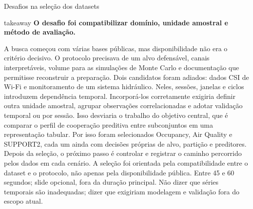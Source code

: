 \begin{frame}{Desafios na seleção dos datasets}
  \vspace{.12cm}
  \begin{beamercolorbox}[wd=\linewidth,sep=.12cm,rounded=true]{takeaway}
    \centering\sffamily\bfseries\fontsize{10.1}{12.0}\selectfont
    O desafio foi compatibilizar domínio, unidade amostral e método de avaliação.
  \end{beamercolorbox}

  \speakernotes
    {A busca começou com várias bases públicas, mas disponibilidade não era o critério decisivo. O protocolo precisava de um alvo defensável, canais interpretáveis, volume para as simulações de Monte Carlo e documentação que permitisse reconstruir a preparação. Dois candidatos foram adiados: dados CSI de Wi-Fi e monitoramento de um sistema hidráulico. Neles, sessões, janelas e ciclos introduzem dependência temporal. Incorporá-los corretamente exigiria definir outra unidade amostral, agrupar observações correlacionadas e adotar validação temporal ou por sessão. Isso desviaria o trabalho do objetivo central, que é comparar o perfil de cooperação preditiva entre subconjuntos em uma representação tabular. Por isso foram selecionados Occupancy, Air Quality e SUPPORT2, cada um ainda com decisões próprias de alvo, partição e preditores.}
    {Depois da seleção, o próximo passo é controlar e registrar o caminho percorrido pelos dados em cada cenário.}
    {A seleção foi orientada pela compatibilidade entre o dataset e o protocolo, não apenas pela disponibilidade pública.}
    {Entre 45 e 60 segundos; slide opcional, fora da duração principal.}
    {Não dizer que séries temporais são inadequadas; dizer que exigiriam modelagem e validação fora do escopo atual.}
\end{frame}


